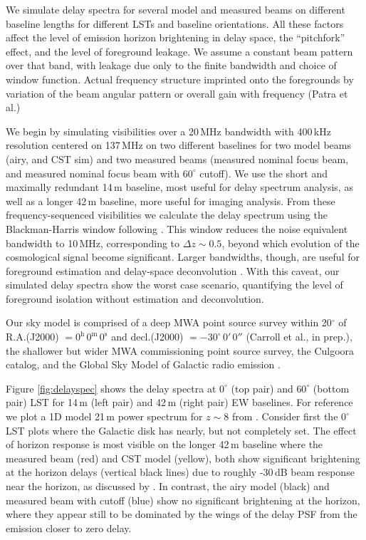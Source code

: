 \documentclass[preprint]{aastex}
\begin{document}
We simulate delay spectra for several model and measured beams on different baseline lengths for different LSTs and baseline orientations. All these factors affect the level of emission horizon brightening in delay space, the ``pitchfork'' effect, and the level of foreground leakage. We assume a constant beam pattern over that band, with leakage due only to the finite bandwidth and choice of window function. Actual frequency structure imprinted onto the foregrounds by variation of the beam angular pattern or overall gain with frequency (Patra et al.)

We begin by simulating visibilities over a 20\,MHz bandwidth with  400\,kHz resolution centered on 137\,MHz on two different baselines for two model beams (airy, and CST sim) and two measured beams (measured nominal focus beam, and measured nominal focus beam with $60^\circ$ cutoff). We use the short and maximally redundant 14\,m baseline, most useful for delay spectrum analysis, as well as a longer 42\,m baseline, more useful for imaging analysis. From these frequency-sequenced visibilities we calculate the delay spectrum  \citep{perbaselinetechnique} using the Blackman-Harris window following \citet{nithya15}. This window reduces the noise equivalent bandwidth to 10\,MHz, corresponding to $\Delta z\sim0.5$, beyond which evolution of the cosmological signal become significant. Larger bandwidths, though, are useful for foreground estimation and delay-space deconvolution \citep{parsonsandbacker,paper32,paper64}. With this caveat, our simulated delay spectra show the worst case scenario, quantifying the level of foreground isolation without estimation and deconvolution.

Our sky model is comprised of a deep MWA point source survey within 20$^\circ$ of R.A.(J2000) $= 0^\text{h}\,0^\text{m}\,0^\text{s}$ and decl.(J2000) $= -30^\circ\,0'\,0''$ (Carroll et al., in prep.), the shallower but wider MWA commissioning point source survey\citep{MWACS}, the Culgoora catalog\citep{Slee1995}, and the Global Sky Model of Galactic radio emission \citep{gsm}. 

Figure \ref{fig:delayspec} shows the delay spectra at $0^\circ$ (top pair) and $60^\circ$ (bottom pair) LST for 14\,m (left pair) and 42\,m (right pair) EW baselines. For reference we plot a 1D model 21\,m power spectrum for $z\sim8$ from \citet{21cmfast}. Consider first the $0^\circ$ LST plots where the Galactic disk has nearly, but not completely set. The effect of horizon response is most visible on the longer 42\,m baseline where the measured beam (red) and CST model (yellow), both show significant brightening at the horizon delays (vertical black lines) due to roughly -30\,dB beam response near the horizon, as discussed by \citet{nithya15,nithya15}. In contrast, the airy model (black) and measured beam with cutoff (blue) show no significant brightening at the horizon, where they appear still to be dominated by the wings of the delay PSF from the emission closer to zero delay. 
\end{document}
